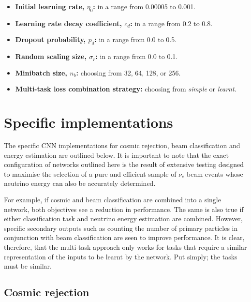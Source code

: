 \begin{itemize}
    \item \textbf{Initial learning rate, $\eta_{0}$:} in a range from 0.00005 to 0.001.
    \item \textbf{Learning rate decay coefficient, $c_{d}$:} in a range from 0.2 to 0.8.
    \item \textbf{Dropout probability, $p_{d}$:} in a range from 0.0 to 0.5.
    \item \textbf{Random scaling size, $\sigma_{r}$:} in a range from 0.0 to 0.1.
    \item \textbf{Minibatch size, $n_{b}$:} choosing from 32, 64, 128, or 256.
    \item \textbf{Multi-task loss combination strategy:} choosing from \emph{simple} or
          \emph{learnt}.
\end{itemize}

\section{Specific implementations} %
\label{sec:cnn_specific} %

The specific CNN implementations for cosmic rejection, beam classification and energy estimation
are outlined below. It is important to note that the exact configuration of networks outlined here
is the result of extensive testing designed to maximise the selection of a pure and efficient
sample of $\nu_{e}$ beam events whose neutrino energy can also be accurately determined.

For example, if cosmic and beam classification are combined into a single network, both objectives
see a reduction in performance. The same is also true if either classification task and neutrino
energy estimation are combined. However, specific secondary outputs such as counting the number of
primary particles in conjunction with beam classification are seen to improve performance. It is
clear, therefore, that the multi-task approach only works for tasks that require a similar
representation of the inputs to be learnt by the network. Put simply; the tasks must be similar.

\subsection{Cosmic rejection} %
\label{sec:cnn_specific_cosmic} %

